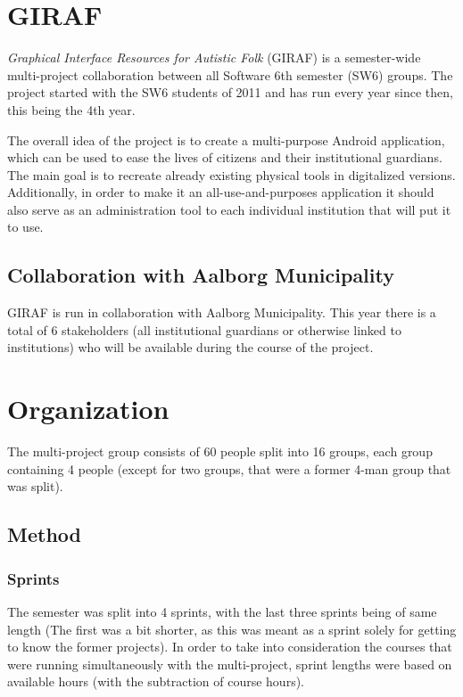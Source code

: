 \section{GIRAF}

\textit{Graphical Interface Resources for Autistic Folk} (GIRAF) is a semester-wide multi-project collaboration between all Software 6th semester (SW6) groups.
The project started with the SW6 students of 2011 and has run every year since then, this being the 4th year.

The overall idea of the project is to create a multi-purpose Android application, which can be used to ease the lives of citizens and their institutional guardians.
The main goal is to recreate already existing physical tools in digitalized versions.
Additionally, in order to make it an all-use-and-purposes application it should also serve as an administration tool to each individual institution that will put it to use.

\subsection*{Collaboration with Aalborg Municipality}
GIRAF is run in collaboration with Aalborg Municipality.
This year there is a total of 6 stakeholders (all institutional guardians or otherwise linked to institutions) who will be available during the course of the project.

\section{Organization}
The multi-project group consists of 60 people split into 16 groups, each group containing 4 people (except for two groups, that were a former 4-man group that was split).

\subsection{Method}

\subsubsection{Sprints}
The semester was split into 4 sprints, with the last three sprints being of same length (The first was a bit shorter, as this was meant as a sprint solely for getting to know the former projects).
In order to take into consideration the courses that were running simultaneously with the multi-project, sprint lengths were based on available hours (with the subtraction of course hours).

